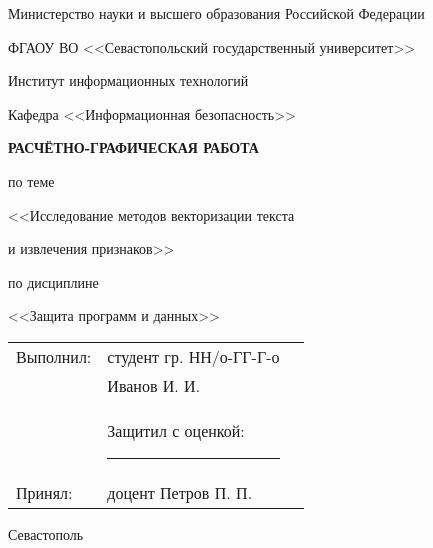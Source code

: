 \documentclass[14pt, a4paper, titlepage]{extarticle}
\begin{document}
    \begin{titlepage}
        \pagestyle{empty}
        \setlength\parindent{0pt}

        \begin{center}
            Министерство науки и высшего образования Российской Федерации

            ФГАОУ ВО <<Севастопольский государственный университет>>

            Институт информационных технологий
        \end{center}

        \bigskip
        \bigskip

        \begin{flushright}
            Кафедра <<Информационная безопасность>>
        \end{flushright}

        \bigskip
        \bigskip
        \bigskip

        \begin{center}
            \textbf{РАСЧЁТНО-ГРАФИЧЕСКАЯ РАБОТА}

            по теме

            <<Исследование методов векторизации текста

            и извлечения признаков>>

            по дисциплине

            <<Защита программ и данных>>
        \end{center}

        \bigskip
        \bigskip
        \bigskip
        \bigskip

        \begin{flushright}
            \begin{tabularx}{265pt}{lr@{\quad}X}
                \multicolumn{1}{l}{Выполнил:} & \multicolumn{1}{l}{студент гр. НН/о-ГГ-Г-о} \\
                                              & \multicolumn{1}{l}{Иванов И. И.} \\
                                              & \multicolumn{1}{l}{Защитил с оценкой: \rule{1.2cm}{0.25mm}} \\
                \multicolumn{1}{l}{Принял:}   & \multicolumn{1}{l}{доцент Петров П. П.}
            \end{tabularx}       
        \end{flushright}

        \begin{center}
            \vfill
            Севастополь

            \the\year{}
        \end{center}
    \end{titlepage}
\end{document}
